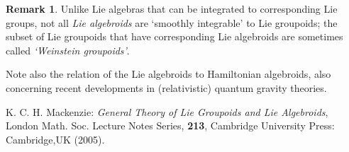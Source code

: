 \documentclass[12pt]{article}
\theoremstyle{plain}
\theoremstyle{definition}
\newtheorem{remark}{Remark}[section]
\numberwithin{equation}{section}
\newcommand{\<}{{\langle}}
\begin{document}
\begin{remark}
Unlike Lie algebras that can be integrated to corresponding Lie groups, not all {\em Lie algebroids} are `smoothly integrable' to Lie groupoids; the subset of Lie groupoids that have corresponding Lie algebroids are sometimes called {\em `Weinstein groupoids'}.
\end{remark}

Note also the relation of the Lie algebroids to  Hamiltonian algebroids, also concerning recent developments in  (relativistic) quantum gravity theories.

\begin{thebibliography}{9}
K. C. H. Mackenzie: \emph{General Theory of Lie Groupoids and Lie
Algebroids}, London Math. Soc. Lecture Notes Series, \textbf{213},
Cambridge University Press: Cambridge,UK (2005).
\end{thebibliography}

\end{document}
